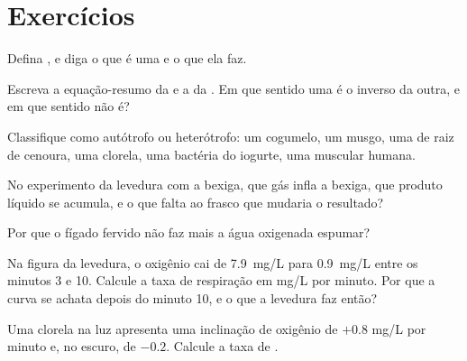 \section{Exercícios}

\begin{exercise}[$\star$]\label{exo:g10:cell-metabolism:1}
Defina , e diga o que é uma  e o que ela faz.
\end{exercise}

\begin{exercise}[$\star$]\label{exo:g10:cell-metabolism:2}
Escreva a equação-resumo da  e a da . Em
que sentido uma é o inverso da outra, e em que sentido não é?
\end{exercise}

\begin{exercise}[$\star$]\label{exo:g10:cell-metabolism:3}
Classifique como autótrofo ou heterótrofo: um cogumelo, um musgo, uma
 de raiz de cenoura, uma clorela, uma bactéria do iogurte, uma
 muscular humana.
\end{exercise}

\begin{exercise}[$\star$]\label{exo:g10:cell-metabolism:4}
No experimento da levedura com a bexiga, que gás infla a bexiga, que
produto líquido se acumula, e o que falta ao frasco que mudaria o
resultado?
\end{exercise}

\begin{exercise}[$\star$]\label{exo:g10:cell-metabolism:5}
Por que o fígado fervido não faz mais a água oxigenada espumar?
\end{exercise}

\begin{exercise}[$\star\star$]\label{exo:g10:cell-metabolism:6}
Na figura da levedura, o oxigênio cai de \qty{7.9}{mg/L} para
\qty{0.9}{mg/L} entre os minutos 3 e 10. Calcule a taxa de respiração
em \unit{mg/L} por minuto. Por que a curva se achata depois do minuto
10, e o que a levedura faz então?
\end{exercise}

\begin{exercise}[$\star\star$]\label{exo:g10:cell-metabolism:7}
Uma clorela na luz apresenta uma inclinação de oxigênio de $+0.8$
\unit{mg/L} por minuto e, no escuro, de $-0.2$. Calcule a taxa de
.
\end{exercise}


